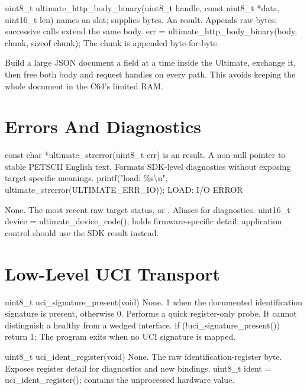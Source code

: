 \begin{referencechapter}
{uint8\_t ultimate\_http\_body\_binary(uint8\_t handle, const uint8\_t *data, uint16\_t len)}
{ names an  slot;  supplies
 bytes.}
{An  result.}
{Appends raw bytes; successive calls extend the same body.}
{err = ultimate\_http\_body\_binary(body, chunk, sizeof chunk);}
{The chunk is appended byte-for-byte.}

\begin{tip}
Build a large JSON document a field at a time inside the Ultimate, exchange it,
then free both body and request handles on every path. This avoids keeping the
whole document in the C64's limited RAM.
\end{tip}

\section{Errors And Diagnostics}

{const char *ultimate\_strerror(uint8\_t err)}
{ is an  result.}
{A non-null pointer to stable PETSCII English text.}
{Formats SDK-level diagnostics without exposing target-specific meanings.}
{printf("load: \%s\textbackslash n", ultimate\_strerror(ULTIMATE\_ERR\_IO));}
{LOAD: I/O ERROR}

{None.}
{The most recent raw target status, or .}
{Aliases  for diagnostics.}
{uint16\_t device = ultimate\_device\_code();}
{ holds firmware-specific detail; application control should use
the SDK result instead.}

\section{Low-Level UCI Transport}

{uint8\_t uci\_signature\_present(void)}
{None.}
{1 when the documented identification signature is present, otherwise 0.}
{Performs a quick register-only probe. It cannot distinguish a healthy from a
wedged interface.}
{if (!uci\_signature\_present()) return 1;}
{The program exits when no UCI signature is mapped.}

{uint8\_t uci\_ident\_register(void)}
{None.}
{The raw identification-register byte.}
{Exposes register detail for diagnostics and new bindings.}
{uint8\_t ident = uci\_ident\_register();}
{ contains the unprocessed hardware value.}


\end{referencechapter}
